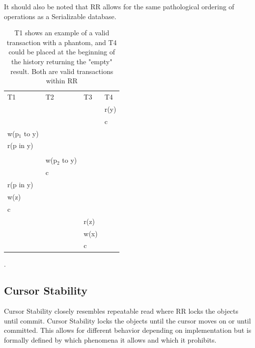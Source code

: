 \documentclass[a4paper,10pt,titlepage]{report}
\begin{document}
    It should also be noted that RR allows for the same pathological ordering of operations as a Serializable database.

    \begin{table}[h]
        \begin{tabular}{l|l|l|l}
            T1            & T2            & T3   & T4   \\
            &               &      & r(y) \\
            &               &      & c    \\
            w(p$_1$ to y) &               &      &      \\
            r(p in y)     &               &      &      \\
            &               &      &      \\
            & w(p$_2$ to y) &      &      \\
            & c             &      &      \\
            r(p in y)     &               &      &      \\
            w(z)          &               &      &      \\
            c             &               &      &      \\
            &               & r(z) &      \\
            &               & w(x) &      \\
            &               & c    &
        \end{tabular}
        \caption{T1 shows an example of a valid transaction with a phantom, and T4 could be placed at the beginning of the history returning the "empty" result. Both are valid transactions within RR}.
    \end{table}

    \subsection{Cursor Stability}
    Cursor Stability closely resembles repeatable read where RR locks the objects until commit. Cursor Stability locks the objects until the cursor moves on or until committed. This allows for different behavior depending on implementation but is formally defined by which phenomena it allows and which it prohibits.
\end{document}
